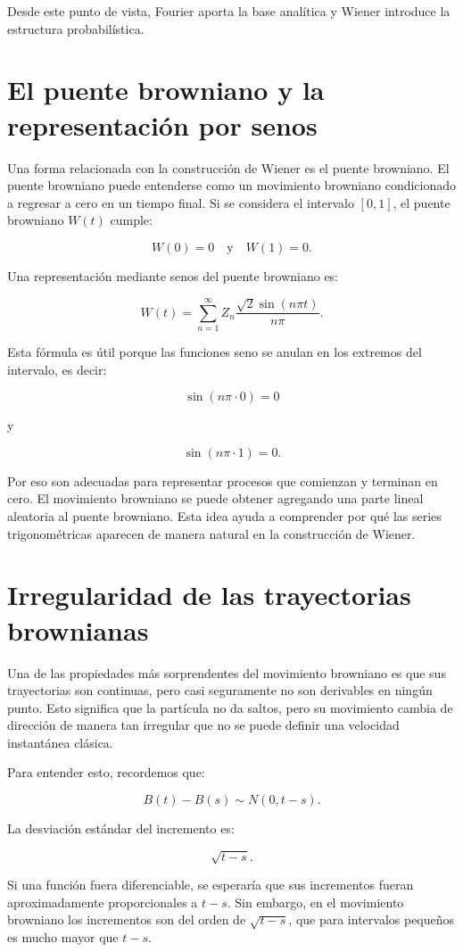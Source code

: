 \documentclass[12pt]{article}
\begin{document}
Desde este punto de vista, Fourier aporta la base analítica y Wiener introduce la estructura probabilística.

\section{El puente browniano y la representación por senos}

Una forma relacionada con la construcción de Wiener es el puente browniano. El puente browniano puede entenderse como un movimiento browniano condicionado a regresar a cero en un tiempo final. Si se considera el intervalo $[0,1]$, el puente browniano $W(t)$ cumple:

\[
W(0)=0
\quad \text{y} \quad
W(1)=0.
\]

Una representación mediante senos del puente browniano es:

\[
W(t)=\sum_{n=1}^{\infty} Z_n \frac{\sqrt{2}\sin(n\pi t)}{n\pi}.
\]

Esta fórmula es útil porque las funciones seno se anulan en los extremos del intervalo, es decir:

\[
\sin(n\pi \cdot 0)=0
\]

y

\[
\sin(n\pi \cdot 1)=0.
\]

Por eso son adecuadas para representar procesos que comienzan y terminan en cero. El movimiento browniano se puede obtener agregando una parte lineal aleatoria al puente browniano. Esta idea ayuda a comprender por qué las series trigonométricas aparecen de manera natural en la construcción de Wiener.

\section{Irregularidad de las trayectorias brownianas}

Una de las propiedades más sorprendentes del movimiento browniano es que sus trayectorias son continuas, pero casi seguramente no son derivables en ningún punto. Esto significa que la partícula no da saltos, pero su movimiento cambia de dirección de manera tan irregular que no se puede definir una velocidad instantánea clásica.

Para entender esto, recordemos que:

\[
B(t)-B(s)\sim N(0,t-s).
\]

La desviación estándar del incremento es:

\[
\sqrt{t-s}.
\]

Si una función fuera diferenciable, se esperaría que sus incrementos fueran aproximadamente proporcionales a $t-s$. Sin embargo, en el movimiento browniano los incrementos son del orden de $\sqrt{t-s}$, que para intervalos pequeños es mucho mayor que $t-s$.
\end{document}

